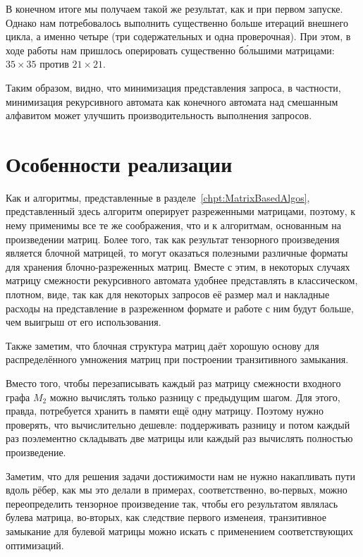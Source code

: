 \begin{example}
В конечном итоге мы получаем такой же результат, как и при первом запуске.
Однако нам потребовалось выполнить существенно больше итераций внешнего цикла, а именно четыре (три содержательных и одна проверочная).
При этом, в ходе работы нам пришлось оперировать существенно б\'{о}льшими матрицами: $35 \times 35$ против $21 \times 21$.

Таким образом, видно, что минимизация представления запроса, в частности, минимизация рекурсивного автомата как конечного автомата над смешанным алфавитом может улучшить производительность выполнения запросов.
\end{example}

\section{Особенности реализации}

Как и алгоритмы, представленные в разделе~\ref{chpt:MatrixBasedAlgos}, представленный здесь алгоритм оперирует разреженными матрицами, поэтому, к нему применимы все те же соображения, что и к алгоритмам, основанным на произведении матриц. Более того, так как результат тензорного произведения является блочной матрицей, то могут оказаться полезными различные форматы для хранения блочно-разреженных матриц. Вместе с этим, в некоторых случаях матрицу смежности рекурсивного автомата удобнее представлять в классическом, плотном, виде, так как для некоторых запросов её размер мал и накладные расходы на представление в разреженном формате и работе с ним будут больше, чем выигрыш от его использования.


Также заметим, что блочная структура матриц даёт хорошую основу для распределённого умножения матриц при построении транзитивного замыкания.

Вместо того, чтобы перезаписывать каждый раз матрицу смежности входного графа $M_2$ можно вычислять только разницу с предыдущим шагом.
Для этого, правда, потребуется хранить в памяти ещё одну матрицу.
Поэтому нужно проверять, что вычислительно дешевле: поддерживать разницу и потом каждый раз поэлементно складывать две матрицы или каждый раз вычислять полностью произведение.

Заметим, что для решения задачи достижимости нам не нужно накапливать пути вдоль рёбер, как мы это делали в примерах, соответственно, во-первых, можно переопределить тензорное произведение так, чтобы его результатом являлась булева матрица, во-вторых, как следствие первого изменеия, транзитивное замыкание для булевой матрицы можно искать с применением соответствующих оптимизаций.


